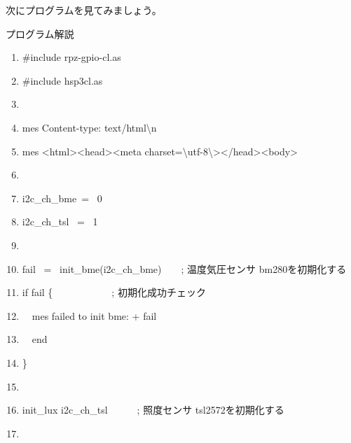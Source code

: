 \documentclass[a4paper,12pt,dvipdfmx]{jarticle}
\begin{document}
次にプログラムを見てみましょう。


\clearpage
プログラム解説



\centering
\begin{boxedminipage}{16.81cm}
	\begin{enumerate}
	\baselineskip 10pt
	\setlength{\itemsep}{0cm}
	\item\#include {\textquotedbl}rpz-gpio-cl.as{\textquotedbl}

	\item\#include {\textquotedbl}hsp3cl.as{\textquotedbl}

	\item

	\item mes {\textquotedbl}Content-type: text/html{\textbackslash}n{\textquotedbl}

	\item mes {\textquotedbl}{\textless}html{\textgreater}{\textless}head{\textgreater}{\textless}meta
	 charset={\textbackslash}{\textquotedbl}utf-8{\textbackslash}{\textquotedbl}{\textgreater}{\textless}/head{\textgreater}{\textless}body{\textgreater}{\textquotedbl}

	\item

	\item i2c\_ch\_bme\ = \ 0

	\item i2c\_ch\_tsl \ = \ 1

	\item

	\item fail \ = \ init\_bme(i2c\_ch\_bme)\ \ \ \ ; 温度気圧センサ bm280を初期化する

	\item if fail \{\ \ \ \ \ \ \ \ \ \ \ \   ; 初期化成功チェック

	\item\ \ mes {\textquotedbl}failed to init bme: {\textquotedbl} + fail

	\item\ \ end

	\item\}

	\item

	\item init\_lux i2c\_ch\_tsl\ \ \ \ \ \ ; 照度センサ tsl2572を初期化する

	\item


\end{enumerate}
\end{boxedminipage}
\end{document}
